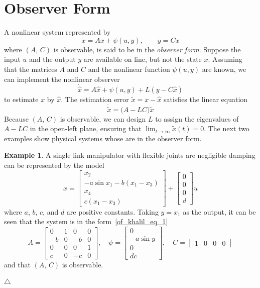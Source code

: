 \documentclass[11pt,a4paper,oneside]{book}
\numberwithin{equation}{section}
\theoremstyle{it}
\theoremstyle{definition}
\newtheorem{example}{Example}[section]
\begin{document}
\section{Observer Form}
A nonlinear system represented by
\begin{equation}\label{of_khalil_eq_1}
	\dot{x}=Ax+\psi(u,y),\qquad y=Cx
\end{equation}
where $(A,\,C)$ is observable, is said to be in the \textit{observer form}. Suppose the input $u$ and the output $y$ are available on line, but not the state $x$. Assuming that the matrices $A$ and $C$ and the nonlinear function $\psi(u,y)$ are known, we can implement the nonlinear observer
\begin{equation}
	\dot{\hat{x}}=A\hat{x}+\psi(u,y)+L(y-C\hat{x})
\end{equation}
to estimate $x$ by $\hat{x}$. The estimation error $\tilde{x}=x-\hat{x}$ satisfies the linear equation
\begin{equation*}
	\dot{\tilde{x}}=\Big(A-LC\Big)\tilde{x}
\end{equation*}
Because $(A,\,C)$ is observable, we can design $L$ to assign the eigenvalues of $A-LC$ in the open-left plane, ensuring that $\lim_{t\rightarrow\infty}\tilde{x}(t)=0$. The next two examples show physical systems whose are in the observer form.
\begin{example}
	A single link manipulator with flexible joints are negligible damping can be represented by the model 
	\begin{equation*}
		\dot{x}=\begin{bmatrix} x_2 \\[6pt] -a\sin x_1-b(x_1-x_3) \\[6pt] x_4 \\[6pt] c(x_1-x_3) \end{bmatrix} + \begin{bmatrix} 0 \\[6pt] 0 \\[6pt] 0 \\[6pt] d \end{bmatrix}u
	\end{equation*}
	where $a$, $b$, $c$, and $d$ are positive constants. Taking $y=x_1$ as the output, it can be seen that the system is in the form~\eqref{of_khalil_eq_1} 
	\begin{equation*} A=\begin{bmatrix} 0& 1&0&0 \\[6pt] -b&0&-b&0 \\[6pt] 0&0&0&1 \\[6pt] c&0&-c&0\end{bmatrix},\quad\psi=\begin{bmatrix} 0 \\[6pt] -a\sin y \\[6pt] 0 \\[6pt] dc \end{bmatrix},\quad C=\begin{bmatrix} 1&0&0&0 \end{bmatrix} 
	\end{equation*}
	and that $(A,\,C)$ is observable.
	
	\hfill$\triangle$
\end{example}
\end{document}
